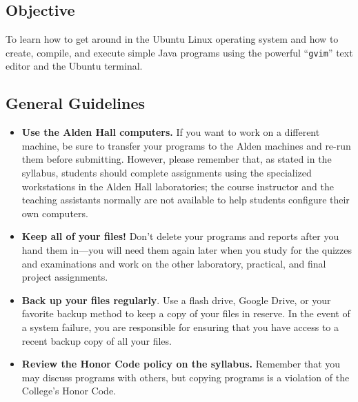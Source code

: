 


\subsection*{Objective}

To learn how to get around in the Ubuntu Linux operating system and how to create, compile, and execute simple Java
programs using the powerful ``{\tt gvim}'' text editor and the Ubuntu terminal.

\vspace*{-.1in}
\subsection*{General Guidelines}

\begin{itemize}
  \setlength{\itemsep}{0pt}

  \item {\bf Use the Alden Hall computers.} If you want to work on a different machine, be sure to transfer your
    programs to the Alden machines and re-run them before submitting. However, please remember that, as stated in the
    syllabus, students should complete assignments using the specialized workstations in the Alden Hall laboratories;
    the course instructor and the teaching assistants normally are not available to help students configure their own
    computers.

  \item {\bf Keep all of your files!} Don't delete your programs and reports after you hand them in---you will need
    them again later when you study for the quizzes and examinations and work on the other laboratory, practical, and
    final project assignments.

  \item {\bf Back up your files regularly}. Use a flash drive, Google Drive, or your favorite backup method to keep a
    copy of your files in reserve. In the event of a system failure, you are responsible for ensuring that you have
    access to a recent backup copy of all your files.

  \item {\bf Review the Honor Code policy on the syllabus.} Remember that you may discuss programs with others, but
    copying programs is a violation of the College's Honor Code.

\end{itemize}

